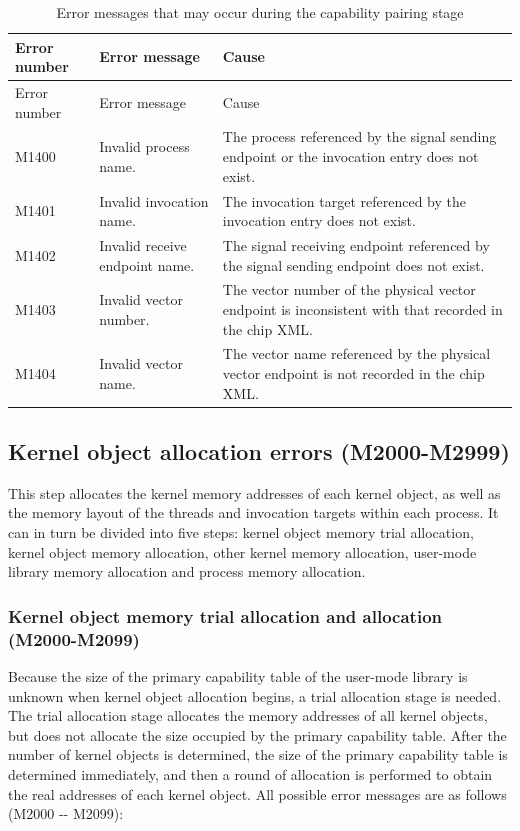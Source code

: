 \begin{xltabular}{\textwidth}{@{}>{\hsize\raggedright\arraybackslash}X>{\hsize\raggedright\arraybackslash}X>{\hsize\raggedright\arraybackslash}X@{}}
\caption{Error messages that may occur during the capability pairing stage}\label{tab:5-22}\\
\toprule
Error number & Error message & Cause\tabularnewline
\endfirsthead
\toprule
Error number & Error message & Cause\tabularnewline
\midrule
\endhead
\bottomrule
\endlastfoot
M1400 & Invalid process name. &
The process referenced by the signal sending endpoint or the invocation entry does not exist.\tabularnewline
M1401 & Invalid invocation name. &
The invocation target referenced by the invocation entry does not exist.\tabularnewline
M1402 & Invalid receive endpoint name. &
The signal receiving endpoint referenced by the signal sending endpoint does not exist.\tabularnewline
M1403 & Invalid vector number. &
The vector number of the physical vector endpoint is inconsistent with that recorded in the chip XML.\tabularnewline
M1404 & Invalid vector name. &
The vector name referenced by the physical vector endpoint is not recorded in the chip XML.\tabularnewline
\end{xltabular}

\subsection{Kernel object allocation errors (M2000-M2999)}\label{subsec:5-6-6}

This step allocates the kernel memory addresses of each kernel object, as well as the memory layout of the threads and invocation targets within each process. It can in turn be divided into five steps: kernel object memory trial allocation, kernel object memory allocation, other kernel memory allocation, user-mode library memory allocation and process memory allocation.

\subsubsection{Kernel object memory trial allocation and allocation (M2000-M2099)}\label{subsubsec:5-6-6-1}

Because the size of the primary capability table of the user-mode library is unknown when kernel object allocation begins, a trial allocation stage is needed. The trial allocation stage allocates the memory addresses of all kernel objects, but does not allocate the size occupied by the primary capability table. After the number of kernel objects is determined, the size of the primary capability table is determined immediately, and then a round of allocation is performed to obtain the real addresses of each kernel object. All possible error messages are as follows (M2000
-\/- M2099):

